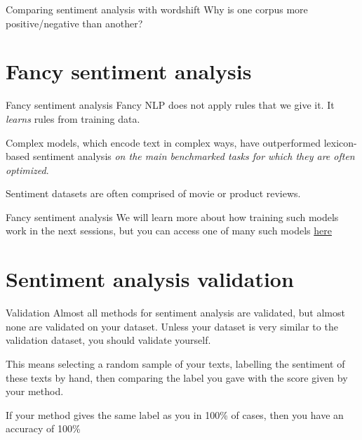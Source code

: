 \documentclass[
  10pt,
  ignorenonframetext,
  aspectratio=169]{beamer}
\begin{document}
\begin{frame}{Comparing sentiment analysis with wordshift}
\protect\hypertarget{comparing-sentiment-analysis-with-wordshift}{}
Why is one corpus more positive/negative than another?
\end{frame}

\hypertarget{fancy-sentiment-analysis}{%
\section{Fancy sentiment analysis}\label{fancy-sentiment-analysis}}

\begin{frame}{Fancy sentiment analysis}
\protect\hypertarget{fancy-sentiment-analysis-1}{}
Fancy NLP does not apply rules that we give it. It \emph{learns} rules
from training data.

Complex models, which encode text in complex ways, have outperformed
lexicon-based sentiment analysis \emph{on the main benchmarked tasks for
which they are often optimized}.

Sentiment datasets are often comprised of movie or product reviews.
\end{frame}

\begin{frame}{Fancy sentiment analysis}
\protect\hypertarget{fancy-sentiment-analysis-2}{}
We will learn more about how training such models work in the next
sessions, but you can access one of many such models
\href{https://huggingface.co/cardiffnlp/twitter-roberta-base-sentiment}{here}
\end{frame}

\hypertarget{sentiment-analysis-validation}{%
\section{Sentiment analysis
validation}\label{sentiment-analysis-validation}}

\begin{frame}{Validation}
\protect\hypertarget{validation}{}
Almost all methods for sentiment analysis are validated, but almost none
are validated on your dataset. Unless your dataset is very similar to
the validation dataset, you should validate yourself.

This means selecting a random sample of your texts, labelling the
sentiment of these texts by hand, then comparing the label you gave with
the score given by your method.

If your method gives the same label as you in 100\% of cases, then you
have an accuracy of 100\%
\end{frame}
\end{document}

